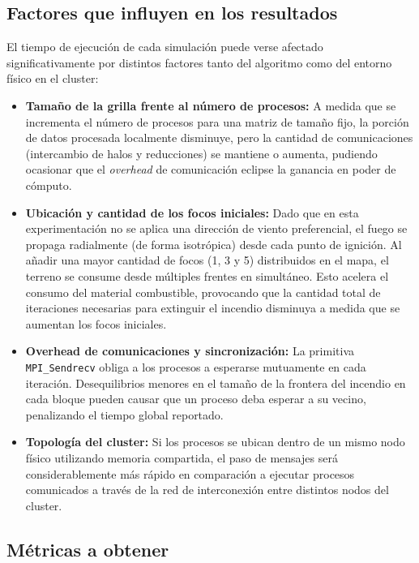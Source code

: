\documentclass[10pt,a4paper]{article}
\begin{document}
\subsection{Factores que influyen en los resultados}

El tiempo de ejecución de cada simulación puede verse afectado significativamente por distintos factores tanto del algoritmo como del entorno físico en el cluster:

\begin{itemize}
    \item \textbf{Tamaño de la grilla frente al número de procesos:} A medida que se incrementa el número de procesos para una matriz de tamaño fijo, la porción de datos procesada localmente disminuye, pero la cantidad de comunicaciones (intercambio de halos y reducciones) se mantiene o aumenta, pudiendo ocasionar que el \textit{overhead} de comunicación eclipse la ganancia en poder de cómputo.
    \item \textbf{Ubicación y cantidad de los focos iniciales:} Dado que en esta experimentación no se aplica una dirección de viento preferencial, el fuego se propaga radialmente (de forma isotrópica) desde cada punto de ignición. Al añadir una mayor cantidad de focos (1, 3 y 5) distribuidos en el mapa, el terreno se consume desde múltiples frentes en simultáneo. Esto acelera el consumo del material combustible, provocando que la cantidad total de iteraciones necesarias para extinguir el incendio disminuya a medida que se aumentan los focos iniciales.
    \item \textbf{Overhead de comunicaciones y sincronización:} La primitiva \texttt{MPI\_Sendrecv} obliga a los procesos a esperarse mutuamente en cada iteración. Desequilibrios menores en el tamaño de la frontera del incendio en cada bloque pueden causar que un proceso deba esperar a su vecino, penalizando el tiempo global reportado.
    \item \textbf{Topología del cluster:} Si los procesos se ubican dentro de un mismo nodo físico utilizando memoria compartida, el paso de mensajes será considerablemente más rápido en comparación a ejecutar procesos comunicados a través de la red de interconexión entre distintos nodos del cluster.
\end{itemize}

\subsection{Métricas a obtener}
\end{document}

